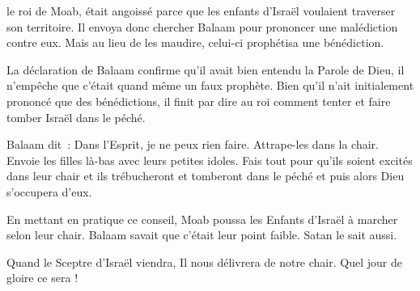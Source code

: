 
 le roi de Moab, était angoissé parce que
 les enfants d'Israël voulaient traverser son territoire.
 Il envoya donc chercher Balaam pour prononcer une malédiction contre eux.
 Mais au lieu de les maudire, celui-ci prophétisa une bénédiction.

La déclaration de Balaam confirme qu'il avait bien entendu la Parole de Dieu,
 il n'empêche que c'était quand même un faux prophète.
 Bien qu'il n'ait initialement prononcé que des bénédictions,
 il finit par dire au roi comment tenter et faire tomber Israël dans le péché.

Balaam dit~:
 \og Dans l'Esprit, je ne peux rien faire. Attrape-les dans la chair.
 Envoie les filles là-bas avec leurs petites idoles.
 Fais tout pour qu'ils soient excités dans leur chair
 et ils trébucheront et tomberont dans le péché
 \ocadr{}et puis alors Dieu s'occupera d'eux. \fg{}

En mettant en pratique ce conseil, Moab poussa les Enfants d'Israël
 à marcher selon leur chair.
 Balaam savait que c'était leur point faible. Satan le sait aussi.


Quand le Sceptre d'Israël viendra, Il nous délivrera de notre chair.
 Quel jour de gloire ce sera ! 

\dvrule






